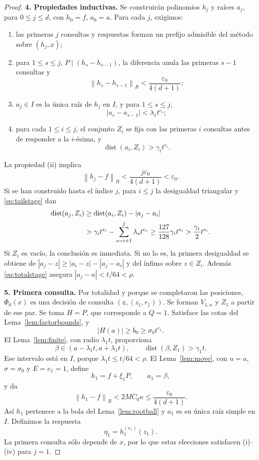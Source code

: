 \documentclass[11pt,a4paper]{article}
\numberwithin{equation}{section}
\theoremstyle{definition}
\theoremstyle{remark}
\newcommand{\norm}[1]{\left\lVert#1\right\rVert}
\newcommand{\ct}{\mathtt c}
\DeclareMathOperator{\dist}{dist}
\newcommand{\paso}[1]{\par\smallskip\noindent\textbf{#1}\quad}
\begin{document}
\begin{proof}
\paso{4. Propiedades inductivas.}
Se construirán polinomios $h_j$ y raíces $a_j$, para $0\le j\le d$, con $h_0=f$, $a_0=a$. Para cada $j$, exigimos:
\begin{enumerate}[label=(\roman*)]
\item las primeras $j$ consultas y respuestas forman un prefijo admisible del método sobre $(h_j,x)$;
\item para $1\le s\le j$, $P\mid(h_s-h_{s-1})$, la diferencia anula las primeras $s-1$ consultas y
\[
\norm{h_s-h_{s-1}}_R<\frac{\varepsilon_0}{4(d+1)};
\]
\item $a_j\in I$ es la única raíz de $h_j$ en $I$, y para $1\le s\le j$,
\[
|a_s-a_{s-1}|<\lambda_st^{e_s};
\]
\item para cada $1\le i\le j$, el conjunto $Z_i$ se fija con las primeras $i$ consultas antes de responder a la $i$-ésima, y
\[
\dist(a_i,Z_i)>\gamma_it^{e_i}.
\]
\end{enumerate}
La propiedad (ii) implica
\begin{equation}\label{eq:ballstage}
\norm{h_j-f}_R<\frac{j\varepsilon_0}{4(d+1)}<\varepsilon_0.
\end{equation}
Si se han construido hasta el índice $j$, para $i\le j$ la desigualdad triangular y \eqref{eq:tailstage} dan
\begin{align}
\dist(a_j,Z_i)
&\ge\dist(a_i,Z_i)-|a_j-a_i|\notag\\
&>\gamma_it^{e_i}-\sum_{s=i+1}^j\lambda_st^{e_s}
\ge\frac{127}{128}\gamma_it^{e_i}
>\frac{\gamma_i}{2}t^{e_i}.\label{eq:retainedsep}
\end{align}
Si $Z_i$ es vacío, la conclusión es inmediata. Si no lo es, la primera desigualdad se obtiene de $|a_j-z|\ge|a_i-z|-|a_j-a_i|$ y del ínfimo sobre $z\in Z_i$. Además \eqref{eq:totalstage} asegura $|a_j-a|<t/64<\rho$.

\paso{5. Primera consulta.}
Por totalidad y porque se completaron las posiciones, $\Phi_0(x)$ es una decisión de consulta $(\ct,(z_1,r_1))$. Se forman $V_{1,n}$ y $Z_1$ a partir de ese par. Se toma $H=P$, que corresponde a $Q=1$. Satisface las cotas del Lema~\ref{lem:factorbounds}, y
\[
|H(a)|\ge b_0\ge\sigma_0t^{e_1}.
\]
El Lema~\ref{lem:finite}, con radio $\lambda_1t$, proporciona
\[
\beta\in(a-\lambda_1t,a+\lambda_1t),\qquad
\dist(\beta,Z_1)>\gamma_1t.
\]
Ese intervalo está en $I$, porque $\lambda_1t\le t/64<\rho$. El Lema~\ref{lem:move}, con $u=a$, $\sigma=\sigma_0$ y $E=e_1=1$, define
\[
h_1=f+\xi_1P,\qquad a_1=\beta,
\]
y da
\[
\norm{h_1-f}_R<2MC_0\kappa
\le\frac{\varepsilon_0}{4(d+1)}.
\]
Así $h_1$ pertenece a la bola del Lema~\ref{lem:rootball} y $a_1$ es su única raíz simple en $I$. Definimos la respuesta
\[
\eta_1=h_1^{(r_1)}(z_1).
\]
La primera consulta sólo depende de $x$, por lo que estas elecciones satisfacen (i)--(iv) para $j=1$.


\end{proof}
\end{document}
